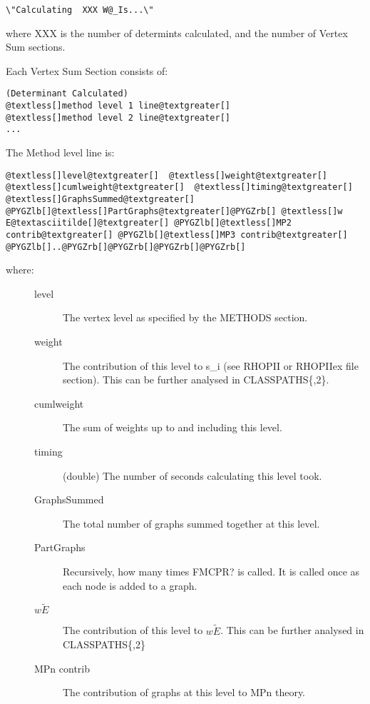 \documentclass[openany,a4paper,10pt,english]{manual}
\begin{document}
\begin{Verbatim}[commandchars=@\[\]]
\"Calculating  XXX W@_Is...\"
\end{Verbatim}

where XXX is the number of determints calculated, and the number of Vertex Sum sections.

Each Vertex Sum Section consists of:

\begin{Verbatim}[commandchars=@\[\]]
(Determinant Calculated)
@textless[]method level 1 line@textgreater[]
@textless[]method level 2 line@textgreater[]
...
\end{Verbatim}

The Method level line is:

\begin{Verbatim}[commandchars=@\[\]]
@textless[]level@textgreater[]  @textless[]weight@textgreater[]  @textless[]cumlweight@textgreater[]  @textless[]timing@textgreater[] @textless[]GraphsSummed@textgreater[]  @PYGZlb[]@textless[]PartGraphs@textgreater[]@PYGZrb[] @textless[]w E@textasciitilde[]@textgreater[] @PYGZlb[]@textless[]MP2 contrib@textgreater[] @PYGZlb[]@textless[]MP3 contrib@textgreater[] @PYGZlb[]..@PYGZrb[]@PYGZrb[]@PYGZrb[]@PYGZrb[]
\end{Verbatim}
\begin{description}
\item[where:] \leavevmode\begin{description}
\item[level] \leavevmode
The vertex level as specified by the METHODS section.

\item[weight] \leavevmode
The contribution of this level to s\_i (see RHOPII or RHOPIIex file section).  This can be further analysed in CLASSPATHS\{,2\}.

\item[cumlweight] \leavevmode
The sum of weights up to and including this level.

\item[timing] \leavevmode
(double) The number of seconds calculating this level took.

\item[GraphsSummed] \leavevmode
The total number of graphs summed together at this level.

\item[PartGraphs] \leavevmode
Recursively, how many times FMCPR?  is called.  It is called once as each node is added to a graph.

\item[$w \tilde{E}$] \leavevmode
The contribution of this level to $w \tilde{E}$.  This can be further analysed in CLASSPATHS\{,2\}

\item[MPn contrib] \leavevmode
The contribution of graphs at this level to MPn theory.

\end{description}

\end{description}
\end{document}
